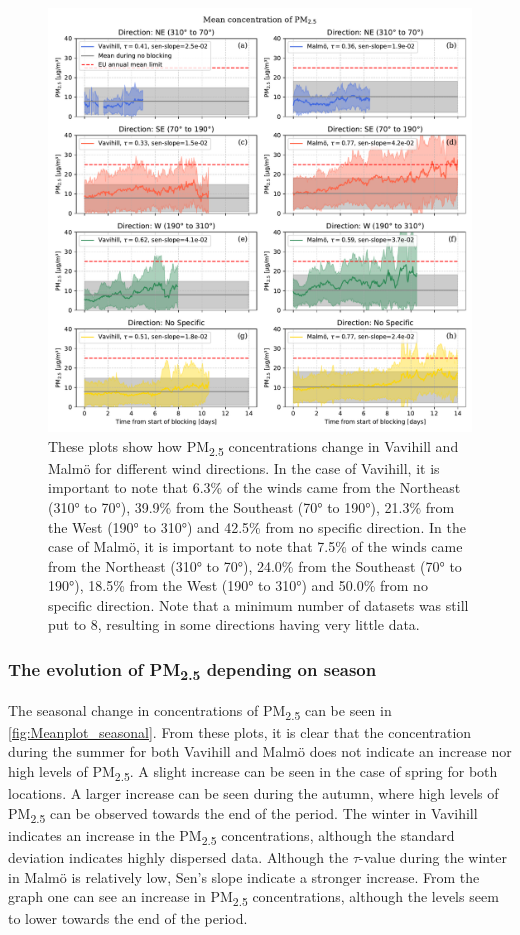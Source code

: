 \begin{figure}[H]
    \centering
    \includegraphics[width=\textwidth]{Figures/Meanplot_dir.pdf}
    \caption{These plots show how PM\textsubscript{2.5} concentrations change in Vavihill and Malmö for different wind directions. In the case of Vavihill, it is important to note that 6.3\% of the winds came from the Northeast (310° to 70°), 39.9\% from the Southeast (70° to 190°), 21.3\% from the West (190° to 310°) and 42.5\% from no specific direction. In the case of Malmö, it is important to note that 7.5\% of the winds came from the Northeast (310° to 70°), 24.0\% from the Southeast (70° to 190°), 18.5\% from the West (190° to 310°) and 50.0\% from no specific direction. Note that a minimum number of datasets was still put to 8, resulting in some directions having very little data.}
    \label{fig:Meanplot_wind}
\end{figure}

\subsubsection{The evolution of \texorpdfstring{PM\textsubscript{2.5}}{PM2.5} depending on season}
The seasonal change in concentrations of PM\textsubscript{2.5} can be seen in \autoref{fig:Meanplot_seasonal}. From these plots, it is clear that the concentration during the summer for both Vavihill and Malmö does not indicate an increase nor high levels of PM\textsubscript{2.5}. A slight increase can be seen in the case of spring for both locations. A larger increase can be seen during the autumn, where high levels of PM\textsubscript{2.5} can be observed towards the end of the period. The winter in Vavihill indicates an increase in the PM\textsubscript{2.5} concentrations, although the standard deviation indicates highly dispersed data. Although the $\tau$-value during the winter in Malmö is relatively low, Sen's slope indicate a stronger increase. From the graph one can see an increase in PM\textsubscript{2.5} concentrations, although the levels seem to lower towards the end of the period.

